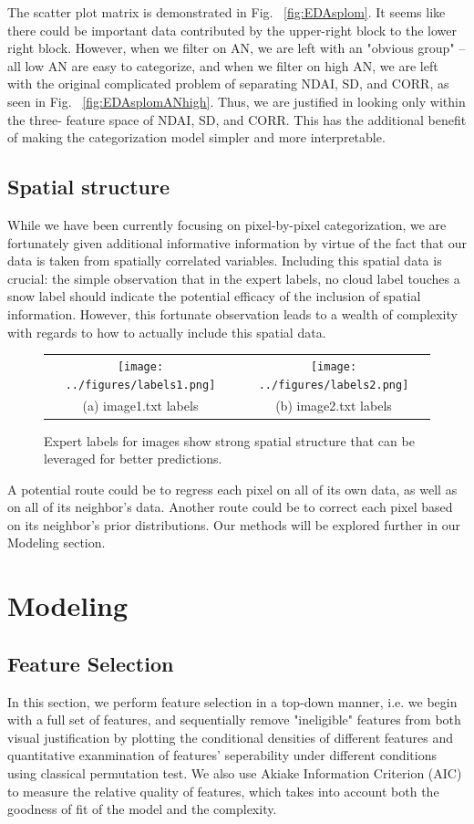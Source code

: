 \documentclass[english]{article}\usepackage{graphicx, color}
\numberwithin{equation}{section}
\numberwithin{figure}{section}
\begin{document}
The scatter plot matrix is demonstrated in Fig. ~\ref{fig:EDAsplom}. It seems 
like there could be important data contributed by the upper-right block to the 
lower right block.  However, when we filter on AN, we are left with an "obvious 
group" -- all low AN are easy to categorize, and when we filter on high AN, we 
are left with the original complicated problem of separating NDAI, SD, and CORR, 
as seen in Fig. ~\ref{fig:EDAsplomANhigh}. Thus, we are justified in looking 
only within the three- feature space of NDAI, SD, and CORR. This has the 
additional benefit of making the categorization model simpler and more interpretable.

\subsection{Spatial structure}
While we have been currently focusing on pixel-by-pixel categorization, we are
fortunately given additional informative information by virtue of the fact that our
data is taken from spatially correlated variables. Including this spatial data is
crucial: the simple observation that in the expert labels, no cloud label touches
a snow label should indicate the potential efficacy of the inclusion of spatial
information. However, this fortunate observation leads to a wealth of complexity
with regards to how to actually include this spatial data.


\begin{figure}[!h]
\begin{tabular}{cc}
  \texttt{[image: ../figures/labels1.png]} &
  \texttt{[image: ../figures/labels2.png]}  \\
  (a) image1.txt labels & (b) image2.txt labels
\end{tabular}
\caption{Expert labels for images show strong spatial structure that can be 
	leveraged for better predictions.}
\end{figure}


A potential route could be to regress each pixel on all of its own data, as well as
on all of its neighbor's data. Another route could be to correct each pixel based
on its neighbor's prior distributions. Our methods will be explored further in our
Modeling section.


\section{Modeling}

\subsection{Feature Selection}
In this section, we perform feature selection in a top-down manner, i.e. we 
begin with a full set of features, and sequentially remove "ineligible" 
features from both visual justification by plotting the conditional densities
of different features and quantitative exanmination of features' seperability 
under different conditions using classical permutation test. We also use 
Akiake Information Criterion (AIC) to measure the relative quality of features, 
which takes into account both the goodness of fit of the model and the 
complexity.\\
\end{document}
